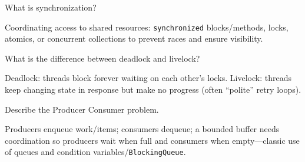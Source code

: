 \question[4]
What is synchronization?
\makeemptybox{1.2in}
\begin{solution}
  Coordinating access to shared resources: \texttt{synchronized} blocks/methods, locks, atomics, or concurrent collections to prevent races and ensure visibility.
\end{solution}

\question[4]
What is the difference between deadlock and livelock?
\makeemptybox{1.25in}
\begin{solution}
  Deadlock: threads block forever waiting on each other's locks. Livelock: threads keep changing state in response but make no progress (often ``polite'' retry loops).
\end{solution}

\question[4]
Describe the Producer Consumer problem.
\makeemptybox{1.35in}
\begin{solution}
  Producers enqueue work/items; consumers dequeue; a bounded buffer needs coordination so producers wait when full and consumers when empty---classic use of queues and condition variables/\texttt{BlockingQueue}.
\end{solution}

